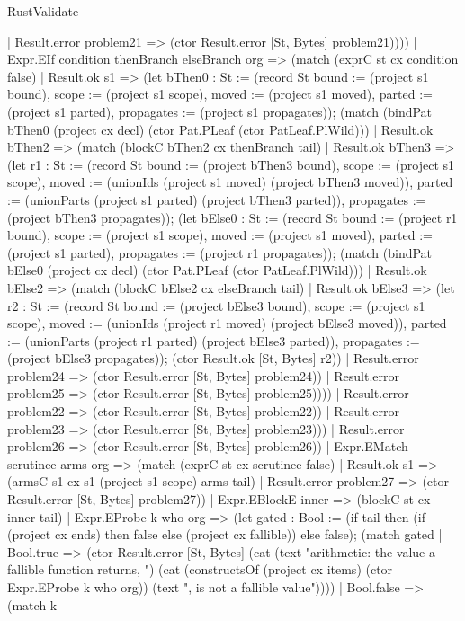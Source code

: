 \begin{lexlean}{RustValidate}
\begin{semanticmodule}
{        | Result.error problem21 => (ctor Result.error [St, Bytes] problem21))))
    | Expr.EIf condition thenBranch elseBranch org => (match (exprC st cx condition false)
      | Result.ok s1 => (let bThen0 : St := (record St {bound := (project s1 bound), scope := (project s1 scope), moved := (project s1 moved), parted := (project s1 parted), propagates := (project s1 propagates)}); (match (bindPat bThen0 (project cx decl) (ctor Pat.PLeaf (ctor PatLeaf.PlWild)))
        | Result.ok bThen2 => (match (blockC bThen2 cx thenBranch tail)
          | Result.ok bThen3 => (let r1 : St := (record St {bound := (project bThen3 bound), scope := (project s1 scope), moved := (unionIds (project s1 moved) (project bThen3 moved)), parted := (unionParts (project s1 parted) (project bThen3 parted)), propagates := (project bThen3 propagates)}); (let bElse0 : St := (record St {bound := (project r1 bound), scope := (project s1 scope), moved := (project s1 moved), parted := (project s1 parted), propagates := (project r1 propagates)}); (match (bindPat bElse0 (project cx decl) (ctor Pat.PLeaf (ctor PatLeaf.PlWild)))
            | Result.ok bElse2 => (match (blockC bElse2 cx elseBranch tail)
              | Result.ok bElse3 => (let r2 : St := (record St {bound := (project bElse3 bound), scope := (project s1 scope), moved := (unionIds (project r1 moved) (project bElse3 moved)), parted := (unionParts (project r1 parted) (project bElse3 parted)), propagates := (project bElse3 propagates)}); (ctor Result.ok [St, Bytes] r2))
              | Result.error problem24 => (ctor Result.error [St, Bytes] problem24))
            | Result.error problem25 => (ctor Result.error [St, Bytes] problem25))))
          | Result.error problem22 => (ctor Result.error [St, Bytes] problem22))
        | Result.error problem23 => (ctor Result.error [St, Bytes] problem23)))
      | Result.error problem26 => (ctor Result.error [St, Bytes] problem26))
    | Expr.EMatch scrutinee arms org => (match (exprC st cx scrutinee false)
      | Result.ok s1 => (armsC s1 cx s1 (project s1 scope) arms tail)
      | Result.error problem27 => (ctor Result.error [St, Bytes] problem27))
    | Expr.EBlockE inner => (blockC st cx inner tail)
    | Expr.EProbe k who org => (let gated : Bool := (if tail then (if (project cx ends) then false else (project cx fallible)) else false); (match gated
      | Bool.true => (ctor Result.error [St, Bytes] (cat (text "arithmetic: the value a fallible function returns, ") (cat (constructsOf (project cx items) (ctor Expr.EProbe k who org)) (text ", is not a fallible value"))))
      | Bool.false => (match k
}
\end{semanticmodule}
\end{lexlean}
